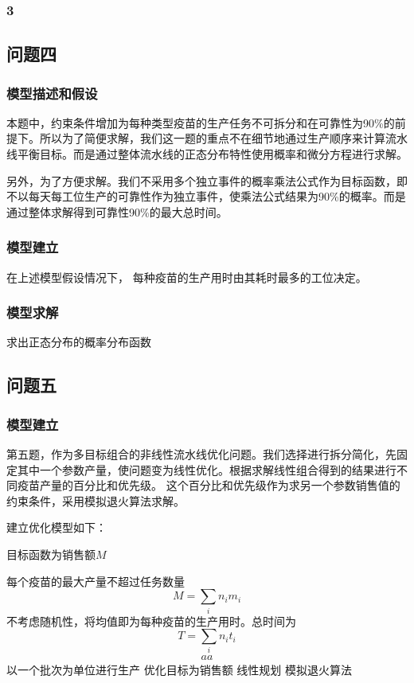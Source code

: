\documentclass[UTF8]{ctexart}
\begin{document}
	\subsubsection{3}
	
	\subsection{问题四}
	\subsubsection{模型描述和假设}
	
	本题中，约束条件增加为每种类型疫苗的生产任务不可拆分和在可靠性为90\%的前提下。所以为了简便求解，我们这一题的重点不在细节地通过生产顺序来计算流水线平衡目标。而是通过整体流水线的正态分布特性使用概率和微分方程进行求解。
	
	另外，为了方便求解。我们不采用多个独立事件的概率乘法公式作为目标函数，即不以每天每工位生产的可靠性作为独立事件，使乘法公式结果为90\%的概率。而是通过整体求解得到可靠性90\%的最大总时间。
	\subsubsection{模型建立}
	在上述模型假设情况下，
	每种疫苗的生产用时由其耗时最多的工位决定。
	\subsubsection{模型求解}
	求出正态分布的概率分布函数
	\subsection{问题五}
	\subsubsection{模型建立}
	
	第五题，作为多目标组合的非线性流水线优化问题。我们选择进行拆分简化，先固定其中一个参数产量，使问题变为线性优化。根据求解线性组合得到的结果进行不同疫苗产量的百分比和优先级。
	这个百分比和优先级作为求另一个参数销售值的约束条件，采用模拟退火算法求解。
	
	建立优化模型如下：
	
	目标函数为销售额$M$
	
	每个疫苗的最大产量不超过任务数量
	\begin{equation}
	M=\sum_{i}n_{i}m_{i}
	\end{equation}
	不考虑随机性，将均值即为每种疫苗的生产用时。总时间为
	\begin{equation}
	T=\sum_{i}n_{i}t_{i}
	\end{equation}
	\begin{equation}
	\begin{split}
	aa
	\end{split}
	\end{equation}
	以一个批次为单位进行生产
	优化目标为销售额
	线性规划
	模拟退火算法
\end{document}
